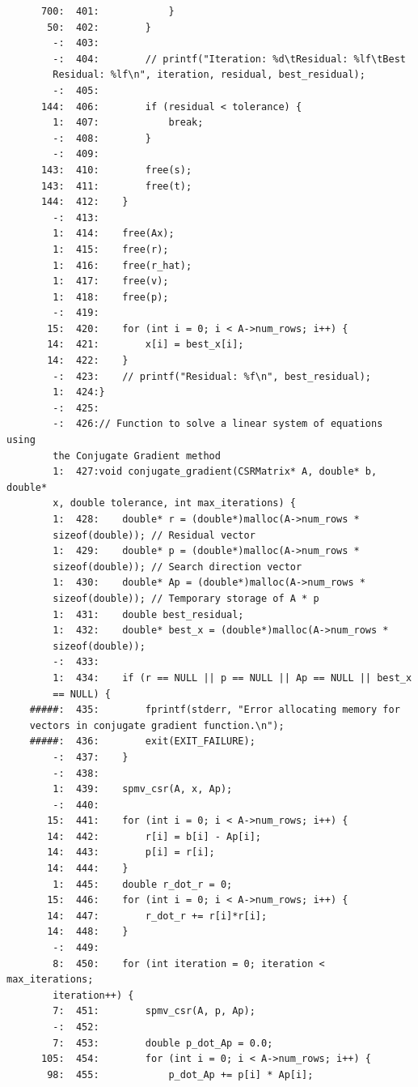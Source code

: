 \documentclass[12pt]{article}
\begin{document}
\begin{mdframed}[style=myboxstyleTerminal1]
\begin{verbatim}
      700:  401:            }
       50:  402:        }
        -:  403:
        -:  404:        // printf("Iteration: %d\tResidual: %lf\tBest 
        Residual: %lf\n", iteration, residual, best_residual);
        -:  405:
      144:  406:        if (residual < tolerance) {
        1:  407:            break;
        -:  408:        }
        -:  409:
      143:  410:        free(s);
      143:  411:        free(t);
      144:  412:    }
        -:  413:
        1:  414:    free(Ax);
        1:  415:    free(r);
        1:  416:    free(r_hat);
        1:  417:    free(v);
        1:  418:    free(p);
        -:  419:
       15:  420:    for (int i = 0; i < A->num_rows; i++) {
       14:  421:        x[i] = best_x[i];
       14:  422:    }
        -:  423:    // printf("Residual: %f\n", best_residual);
        1:  424:}
        -:  425:
        -:  426:// Function to solve a linear system of equations using 
        the Conjugate Gradient method
        1:  427:void conjugate_gradient(CSRMatrix* A, double* b, double* 
        x, double tolerance, int max_iterations) {
        1:  428:    double* r = (double*)malloc(A->num_rows * 
        sizeof(double)); // Residual vector
        1:  429:    double* p = (double*)malloc(A->num_rows * 
        sizeof(double)); // Search direction vector
        1:  430:    double* Ap = (double*)malloc(A->num_rows * 
        sizeof(double)); // Temporary storage of A * p
        1:  431:    double best_residual;
        1:  432:    double* best_x = (double*)malloc(A->num_rows * 
        sizeof(double));
        -:  433:
        1:  434:    if (r == NULL || p == NULL || Ap == NULL || best_x 
        == NULL) {
    #####:  435:        fprintf(stderr, "Error allocating memory for 
    vectors in conjugate gradient function.\n");
    #####:  436:        exit(EXIT_FAILURE);
        -:  437:    }
        -:  438:
        1:  439:    spmv_csr(A, x, Ap);
        -:  440:
       15:  441:    for (int i = 0; i < A->num_rows; i++) {
       14:  442:        r[i] = b[i] - Ap[i];
       14:  443:        p[i] = r[i];
       14:  444:    }
        1:  445:    double r_dot_r = 0;
       15:  446:    for (int i = 0; i < A->num_rows; i++) {
       14:  447:        r_dot_r += r[i]*r[i];
       14:  448:    }
        -:  449:
        8:  450:    for (int iteration = 0; iteration < max_iterations; 
        iteration++) {
        7:  451:        spmv_csr(A, p, Ap);
        -:  452:        
        7:  453:        double p_dot_Ap = 0.0;
      105:  454:        for (int i = 0; i < A->num_rows; i++) {
       98:  455:            p_dot_Ap += p[i] * Ap[i];

\end{verbatim}
\end{mdframed}
\end{document}
